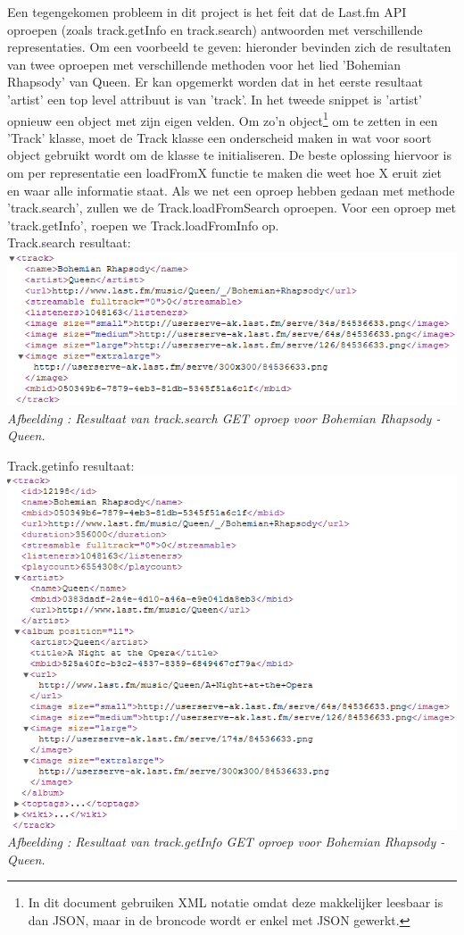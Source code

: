 \documentclass[11pt,a4paper]{article}
\newcounter{figc}
\newcommand{\increaseFigID} {%
   \stepcounter{figc}%
   \thefigc}
\newcommand{\figID}[1]{\small \textit{Afbeelding \increaseFigID : #1} \\ \normalsize}
\begin{document}
	Een tegengekomen probleem in dit project is het feit dat de Last.fm API oproepen (zoals track.getInfo en track.search) antwoorden met verschillende representaties. Om een voorbeeld te geven: hieronder bevinden zich de resultaten van twee oproepen met verschillende methoden voor het lied 'Bohemian Rhapsody' van Queen. Er kan opgemerkt worden dat in het eerste resultaat 'artist' een top level attribuut is van 'track'. In het tweede snippet is 'artist' opnieuw een object met zijn eigen velden. Om zo'n object\footnote{In dit document gebruiken XML notatie omdat deze makkelijker leesbaar is dan JSON, maar in de broncode wordt er enkel met JSON gewerkt.} om te zetten in een 'Track' klasse, moet de Track klasse een onderscheid maken in wat voor soort object gebruikt wordt om de klasse te initialiseren. De beste oplossing hiervoor is om per representatie een loadFromX functie te maken die weet hoe X eruit ziet en waar alle informatie staat. Als we net een oproep hebben gedaan met methode 'track.search', zullen we de Track.loadFromSearch oproepen. Voor een oproep met 'track.getInfo', roepen we Track.loadFromInfo op. \\
	
	Track.search resultaat:\\
	\includegraphics[width=15cm]{Pictures/track_search.png} \\ \newline
	\figID{Resultaat van track.search GET oproep voor Bohemian Rhapsody - Queen.}

	Track.getinfo resultaat: \\
	\includegraphics[width=15cm]{Pictures/track_getinfo.png}\\ \newline
	\figID{Resultaat van track.getInfo GET oproep voor Bohemian Rhapsody - Queen.}
	
\end{document}
